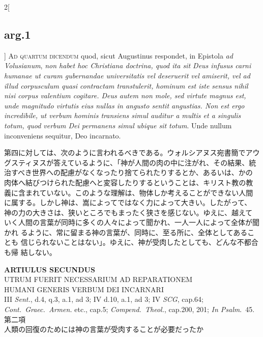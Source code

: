 \documentclass[paper=a4paper,fontsize=10pt,jafontsize=9pt,titlepage]{jlreq}
\begin{document}
\begin{paracol}{2}[\subsection{arg.1}]
{\scshape Ad quartum dicendum} quod, sicut Augustinus respondet, in Epistola {\itshape ad
Volusianum}, {\itshape non habet hoc Christiana doctrina, quod ita sit Deus infusus
carni humanae ut curam gubernandae universitatis vel deseruerit vel
amiserit, vel ad illud corpusculum quasi contractam transtulerit,
hominum est iste sensus nihil nisi corpus valentium cogitare. Deus autem
non mole, sed virtute magnus est, unde magnitudo virtutis eius nullas in
angusto sentit angustias. Non est ergo incredibile, ut verbum hominis
transiens simul auditur a multis et a singulis totum, quod verbum Dei
permanens simul ubique sit totum}. Unde nullum inconveniens sequitur, Deo
incarnato.

\switchcolumn

第四に対しては、次のように言われるべきである。ウォルシアヌス宛書簡でアウ
 グスティヌスが答えているように、「神が人間の肉の中に注がれ、その結果、統
 治すべき世界への配慮がなくなったり捨てられたりするとか、あるいは、かの
 肉体へ結びつけられた配慮へと変容したりするということは、キリスト教の教
 義に含まれていない。このような理解は、物体しか考えることができない人間
 に属する。しかし神は、嵩によってではなく力によって大きい。したがって、
 神の力の大きさは、狭いところでもまったく狭さを感じない。ゆえに、越えて
 いく人間の言葉が同時に多くの人々によって聞かれ、一人一人によって全体が聞かれ
 るように、常に留まる神の言葉が、同時に、至る所に、全体としてあることも
 信じられないことはない」。ゆえに、神が受肉したとしても、どんな不都合も帰
 結しない。

\end{paracol}



\newpage
{}
{}
\setcounter{section}{2}
\setcounter{subsection}{0}


\begin{center}
 {\Large {\bfseries ARTIULUS SECUNDUS}}\\
 {\large UTRUM FUERIT NECESSARIUM AD REPARATIONEM\\HUMANI GENERIS VERBUM
 DEI INCARNARI}\\
 {\footnotesize III {\itshape Sent.}, d.4, q.3, a.1, ad 3; IV d.10, a.1,
 ad 3; IV {\itshape SCG}, cap.64; {\itshape Cont.~Graec.~Armen.} etc.,
 cap.5; {\itshape Compend.~Theol.}, cap.200, 201; {\itshape In Psalm}.~45.}\\
 {\Large 第二項\\人類の回復のためには神の言葉が受肉することが必要だったか}
\end{center}
\end{document}
